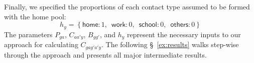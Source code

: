 \par
Finally, we specified the proportions of each contact type assumed to be formed with the home pool:
\begin{equation}
  h_y = \left\{\textstyle
  \textsf{home}:   1,\enspace
  \textsf{work}:   0,\enspace
  \textsf{school}: 0,\enspace
  \textsf{others}: 0 \right\}
\end{equation}
The parameters $P_{ga}$, $C_{aa'y}$, $B_{gg'}$, and $h_y$ represent
the necessary inputs to our approach for calculating $C_{gag'a'y}$.
The following \S~\ref{ex:results} walks step-wise through the approach
and presents all major intermediate results.
\clearpage %
